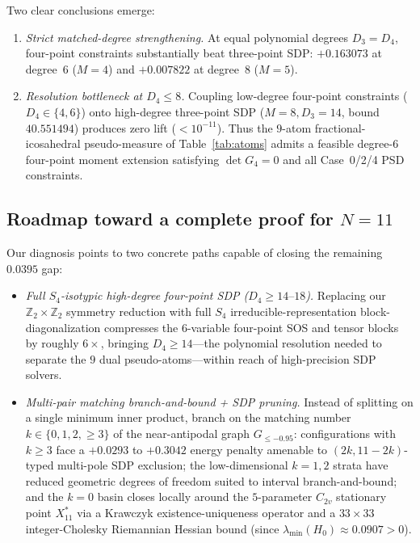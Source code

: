 \documentclass[11pt,reqno]{amsart}
\renewcommand{\_}{\origunderscore\allowbreak}
\theoremstyle{definition}
\newcommand{\Z}{\mathbb{Z}}
\newcommand{\Xstar}{X^*_{11}}
\begin{document}
Two clear conclusions emerge:
\begin{enumerate}[leftmargin=2.2em]
  \item \emph{Strict matched-degree strengthening.} At equal polynomial degrees $D_3 = D_4$, four-point constraints substantially beat three-point SDP: $+0.163073$ at degree~$6$ ($M=4$) and $+0.007822$ at degree~$8$ ($M=5$).
  \item \emph{Resolution bottleneck at $D_4 \le 8$.} Coupling low-degree four-point constraints ($D_4 \in \{4, 6\}$) onto high-degree three-point SDP ($M = 8, D_3 = 14$, bound $40.551494$) produces zero lift ($< 10^{-11}$). Thus the $9$-atom fractional-icosahedral pseudo-measure of Table~\ref{tab:atoms} admits a feasible degree-$6$ four-point moment extension satisfying $\det G_4 = 0$ and all Case~0/2/4 PSD constraints.
\end{enumerate}

\subsection{Roadmap toward a complete proof for \texorpdfstring{$N = 11$}{N = 11}}\label{subsec:roadmap}
Our diagnosis points to two concrete paths capable of closing the remaining $0.0395$ gap:
\begin{itemize}[leftmargin=2em]
  \item \emph{Full $S_4$-isotypic high-degree four-point SDP ($D_4 \ge 14\text{--}18$).} Replacing our $\Z_2 \times \Z_2$ symmetry reduction with full $S_4$ irreducible-representation block-diagonalization compresses the $6$-variable four-point SOS and tensor blocks by roughly $6\times$, bringing $D_4 \ge 14$---the polynomial resolution needed to separate the $9$ dual pseudo-atoms---within reach of high-precision SDP solvers.
  \item \emph{Multi-pair matching branch-and-bound + SDP pruning.} Instead of splitting on a single minimum inner product, branch on the matching number $k \in \{0, 1, 2, \ge 3\}$ of the near-antipodal graph $G_{\le -0.95}$: configurations with $k \ge 3$ face a $+0.0293$ to $+0.3042$ energy penalty amenable to $(2k, 11-2k)$-typed multi-pole SDP exclusion; the low-dimensional $k = 1, 2$ strata have reduced geometric degrees of freedom suited to interval branch-and-bound; and the $k = 0$ basin closes locally around the $5$-parameter $C_{2v}$ stationary point $\Xstar$ via a Krawczyk existence-uniqueness operator and a $33 \times 33$ integer-Cholesky Riemannian Hessian bound (since $\lambda_{\min}(H_0) \approx 0.0907 > 0$).
\end{itemize}
\end{document}

